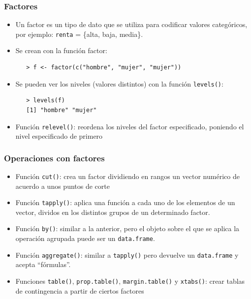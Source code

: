 \documentclass{beamer}
\begin{document}
\begin{frame}[fragile]
\frametitle{Factores}
\begin{itemize}
\item Un factor es un tipo de dato que se utiliza para codificar valores categóricos, por ejemplo: \texttt{renta} = \{alta, baja, media\}.
\item Se crean con la función factor:
\begin{verbatim}
   > f <- factor(c("hombre", "mujer", "mujer"))
\end{verbatim}
\item Se pueden ver los niveles (valores distintos) con la función \texttt{levels()}:
\begin{verbatim}
   > levels(f)
   [1] "hombre" "mujer"
\end{verbatim}
\item Función \texttt{relevel()}: reordena los niveles del factor especificado, poniendo el nivel especificado de primero
\end{itemize}
\end{frame}

\begin{frame}
  \frametitle{Operaciones con factores}
  \begin{itemize}
    \item Función \texttt{cut()}: crea un factor dividiendo en rangos un vector numérico de acuerdo a unos puntos de corte
    \item Función \texttt{tapply()}: aplica una función a cada uno de los elementos de un vector, dividos en los distintos grupos de un determinado factor.
    \item Función \texttt{by()}: similar a la anterior, pero el objeto sobre el que se aplica la operación agrupada puede ser un \texttt{data.frame}.
    \item Función \texttt{aggregate()}: similar a \texttt{tapply()} pero devuelve un \texttt{data.frame} y acepta ``fórmulas''.
    \item Funciones \texttt{table()}, \texttt{prop.table()}, \texttt{margin.table()} y \texttt{xtabs()}: crear tablas de contingencia a partir de ciertos factores
  \end{itemize}
\end{frame}
\end{document}
